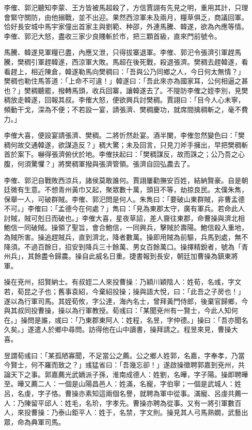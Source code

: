 李傕、郭汜聽知李蒙、王方皆被馬超殺了，方信賈詡有先見之明，重用其計，只理會緊守關防，由他搦戰，並不出迎。果然西涼軍未及兩月，糧草俱乏，商議回軍。恰好長安城中馬宇家僮出首家主與劉範、种邵，外連馬騰、韓遂，欲為內應等情。李傕、郭汜大怒，盡收三家少良賤斬於市，把三顆首級，直來門前號令。

馬騰、韓遂見軍糧已盡，內應又泄，只得拔寨退軍。李傕、郭汜令張濟引軍趕馬騰，樊稠引軍趕韓遂，西涼軍大敗。馬超在後死戰，殺退張濟。樊稠去趕韓遂，看看趕上，相近陳倉，韓遂勒馬向樊稠曰：「吾與公乃同鄉之人，今日何太無情？」樊稠也勒住馬答道：「上命不可違！」韓遂曰：「吾此來亦為國家耳，公何相逼之甚也？」樊稠聽罷，撥轉馬頭，收兵回寨，讓韓遂去了。不隄防李傕之姪李別，見樊稠放走韓遂，回報其叔。李傕大怒，便欲興兵討樊稠。賈詡曰：「目今人心未寧，頻動干戈，深為不便；不若設一宴，請張濟、樊稠慶功，就席間擒稠斬之，毫不費力。」

李傕大喜，便設宴請張濟、樊稠。二將忻然赴宴。酒半闌，李傕忽然變色曰：「樊稠何故交通韓遂，欲謀造反？」稠大驚；未及回言，只見刀斧手擁出，早把樊稠斬首於案下。嚇得張濟俯伏於地。李傕扶起曰：「樊稠謀反，故而誅之；公乃吾之心腹，何須驚懼？」將樊稠軍撥與張濟管領。張濟自回弘農去了。

李傕、郭汜自戰敗西涼兵，諸侯莫敢誰何。賈詡屢勸撫安百姓，結納賢豪。自是朝廷微有生意。不想青州黃巾又起，聚眾數十萬，頭目不等，劫掠良民。太僕朱雋，保舉一人，可破群賊。李傕、郭汜問是何人。朱雋曰：「要破山東群賊，非曹孟德不可。」李傕曰：「孟德今在何處？」雋曰：「見為東郡太守，廣有軍兵。若命此人討賊，賊可剋日而破也。」李傕大喜，星夜草詔，差人齎往東郡，命曹操與濟北相鮑信一同破賊。操領了聖旨，會合鮑信，一同興兵，擊賊於壽陽。鮑信殺入重地，為賊所害。操追趕賊兵，直到濟北，降者數萬。操即用賊為前驅，兵馬到處，無不降須。不過百餘日，招安到降兵三十餘萬、男女百餘萬口。操擇精銳者，號為「青州兵」，其餘盡令歸農。操自此威名日重。捷書報到長安，朝廷加曹操為鎮東將軍。

操在兗州，招賢納士。有叔姪二人來投曹操：乃穎川穎陰人：姓荀，名彧，字文若，荀昆之子也；舊事袁紹，今棄紹投操；操與語大悅，曰：「此吾之子房也！」遂以為行軍司馬。其姪荀攸，字公達，海內名士，曾拜黃門侍郎，後棄官歸鄉，今與其叔同投曹操，操以為行軍教授。荀彧曰：「某聞兗州有一賢士，今此人知何在。」操問是誰，彧曰：「乃東郡東阿人：姓程，名昱，字仲德。」操曰：「吾亦聞名久矣。」遂遣人於鄉中尋問。訪得他在山中讀書，操拜請之。程昱來見，曹操大喜。

昱謂荀彧曰：「某孤陋寡聞，不足當公之薦。公之鄉人姓郭，名嘉，字奉孝，乃當今賢士，何不羅而致之？」彧猛省曰：「吾幾忘卻！」遂啟操徵聘郭嘉到兗州，共論天下之事。郭嘉薦光武嫡派子孫，淮南成德人：姓劉，名曄，字子陽。操即聘曄至。曄又薦二人：一個是山陽昌邑人：姓滿，名寵，字伯寧；一個是武城人：姓呂，名虔，字子恪。曹操亦素知這兩個名譽，就聘為軍中從事。滿寵、呂虔共薦一人：乃陳留平邱人：姓毛，名玠，字孝先。曹操亦聘為從事。又有一將引軍數百人，來投曹操：乃泰山鉅平人：姓于，名禁，字文則。操見其人弓馬熟嫺，武藝出眾，命為典軍司馬。

